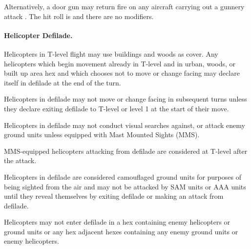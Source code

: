 {{Alternatively, a door gun may return fire on any aircraft carrying out a gunnery attack . The hit roll is  and there are no modifiers. 

}

\paragraph{Helicopter Defilade.}

Helicopters in T-level flight may use buildings and woods as cover.  Any helicopters which begin movement already in T-level and in urban, woods, or built up area hex and which chooses not to move or change facing may declare itself in defilade at the end of the turn.

Helicopters in defilade may not move or change facing in subsequent turns unless they declare exiting defilade to T-level or level 1 at the start of their move. 

Helicopters in defilade may not conduct visual searches against, or attack enemy ground units unless equipped with Mast Mounted Sights (MMS).

MMS-equipped helicopters attacking from defilade are considered at T-level after the attack.

Helicopters in defilade are considered camouflaged ground units for purposes of being sighted from the air and may not be attacked by SAM units or AAA units until they reveal themselves by exiting defilade or making an attack from defilade.

Helicopters may not enter defilade in a hex containing enemy helicopters or ground units or any hex adjacent hexes containing any enemy ground units or enemy helicopters. 

}